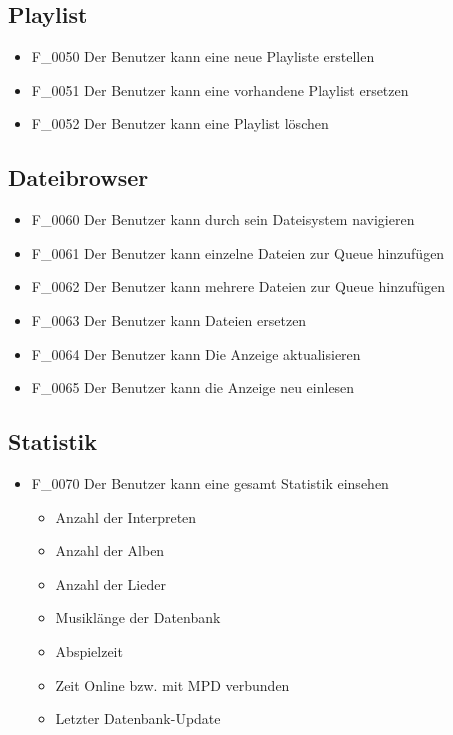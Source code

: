 \subsection{Playlist}
\begin{itemize}
	\item F\_0050 Der Benutzer kann eine neue Playliste erstellen
	\item F\_0051 Der Benutzer kann eine vorhandene Playlist ersetzen
	\item F\_0052 Der Benutzer kann eine Playlist löschen
\end{itemize}
\subsection{Dateibrowser}
\begin{itemize}
	\item F\_0060 Der Benutzer kann durch sein Dateisystem navigieren
	\item F\_0061 Der Benutzer kann einzelne Dateien zur Queue hinzufügen
	\item F\_0062 Der Benutzer kann mehrere Dateien zur Queue hinzufügen
	\item F\_0063 Der Benutzer kann Dateien ersetzen
	\item F\_0064 Der Benutzer kann Die Anzeige aktualisieren
	\item F\_0065 Der Benutzer kann die Anzeige neu einlesen
\end{itemize}
\subsection{Statistik}
\begin{itemize}
	\item F\_0070 Der Benutzer kann eine gesamt Statistik einsehen
	\begin{itemize}
		\item Anzahl der Interpreten
		\item Anzahl der Alben
		\item Anzahl der Lieder
		\item Musiklänge der Datenbank
		\item Abspielzeit	
		\item Zeit Online bzw. mit MPD verbunden
		\item Letzter Datenbank-Update
	\end{itemize}
\end{itemize}
